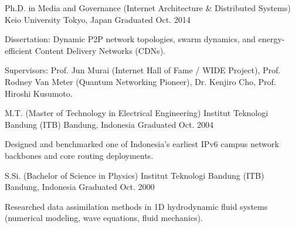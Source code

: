

\begin{cventries}

  \cventry
    {Ph.D. in Media and Governance (Internet Architecture \& Distributed Systems)} %
    {Keio University} %
    {Tokyo, Japan} %
    {Graduated Oct. 2014} %
    {
      \begin{cvitems} %
        \item {Dissertation: Dynamic P2P network topologies, swarm dynamics, and energy-efficient Content Delivery Networks (CDNs).}
        \item {Supervisors: Prof. Jun Murai (Internet Hall of Fame / WIDE Project), Prof. Rodney Van Meter (Quantum Networking Pioneer), Dr. Kenjiro Cho, Prof. Hiroshi Kusumoto.}
      \end{cvitems}
    }

  \cventry
    {M.T. (Master of Technology in Electrical Engineering)} %
    {Institut Teknologi Bandung (ITB)} %
    {Bandung, Indonesia} %
    {Graduated Oct. 2004} %
    {
      \begin{cvitems}
        \item {Designed and benchmarked one of Indonesia's earliest IPv6 campus network backbones and core routing deployments.}
      \end{cvitems}
    }

  \cventry
    {S.Si. (Bachelor of Science in Physics)} %
    {Institut Teknologi Bandung (ITB)} %
    {Bandung, Indonesia} %
    {Graduated Oct. 2000} %
    {
      \begin{cvitems}
        \item {Researched data assimilation methods in 1D hydrodynamic fluid systems (numerical modeling, wave equations, fluid mechanics).}
      \end{cvitems}
    }

\end{cventries}
